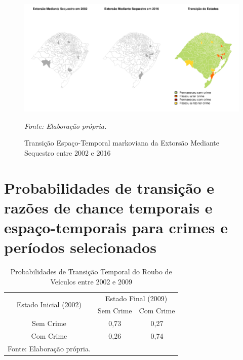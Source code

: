 \documentclass[12pt,openright,oneside,a4paper,english,french,spanish]{abntex2}
\numberwithin{table}{section} %
\numberwithin{figure}{section} %
\newcommand{\source}[1]{\textit{#1}}
\begin{document}
\begin{subappendices}
\begin{figure}[H]
\begin{center}
\includegraphics{TESE_DE_DOUTORADO_RENAN_FINAL-map_extoMS_2002_2016}
\end{center}
\caption{Transição Espaço-Temporal markoviana da Extorsão Mediante Sequestro entre 2002 e 2016}
\source{Fonte: Elaboração própria.}
\label{fig:mapas_extoMS_markov_2002_2016}
\end{figure}










\section{Probabilidades de transição e razões de chance temporais e espaço-temporais para crimes e períodos selecionados\label{appen:prob_odds}}

\begin{table}[H]
\centering
\caption{Probabilidades de Transição Temporal do Roubo de Veículos entre 2002 e 2009}
        \begin{tabular}{ccc}
            \hline
            \multirow{2}{*}{Estado Inicial (2002)} & \multicolumn{2}{c}{Estado Final (2009)}  \\\cline{2-3} 
                                     & \multicolumn{1}{l}{Sem Crime} & \multicolumn{1}{l}{Com Crime} \\\hline
            {Sem Crime} & {0,73} & {0,27} \\                \hline
            {Com Crime} & {0,26} & {0,74} \\                \hline
            \tiny Fonte: Elaboração própria.
        \end{tabular}
    \label{tab:prob_tempo_roub_vei_2002_2009}
\end{table}


\end{subappendices}
\end{document}
